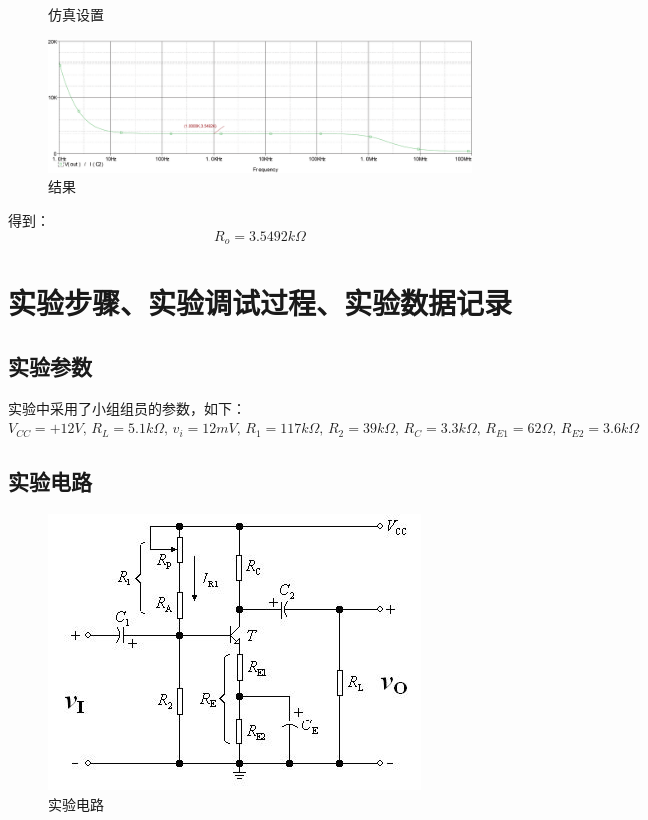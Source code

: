 \documentclass{../source/Experiment}
\begin{document}
\begin{enumerate}
\begin{figure}[h]
                        \caption{仿真设置}
                    \end{figure}
                    \begin{figure}[h]
                        \centering
                        \includegraphics[scale = 0.4]{pic/ro}
                        \caption{结果}
                    \end{figure}
                    得到：
                    $$R_o = 3.5492k\Omega$$
            \end{enumerate}
    \section{实验步骤、实验调试过程、实验数据记录}
        \subsection{实验参数}
        实验中采用了小组组员的参数，如下：
        $V_{CC} = +12V,\, R_L = 5.1k\Omega,\, v_i = 12mV,\, R_1 = 117k\Omega,\, R_2 = 39k\Omega,\, R_C = 3.3k\Omega,\, R_{E1} = 62\Omega,\, R_{E2} = 3.6k\Omega$
        \subsection{实验电路}
            \begin{figure}[h]
                \centering
                \includegraphics{pic/共射放大器.jpg}
                \caption{实验电路}
            \end{figure}
\end{document}
